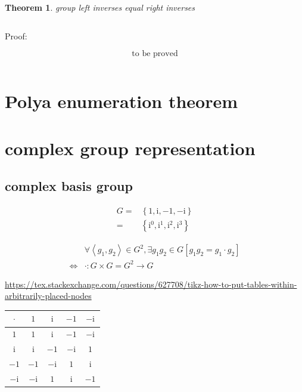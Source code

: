 \documentclass[
]{book}
\newtheorem{theorem}{Theorem}[chapter]
\theoremstyle{definition}
\theoremstyle{definition}
\theoremstyle{definition}
\theoremstyle{definition}
\theoremstyle{remark}
\begin{document}
\begin{theorem}
\protect\hypertarget{thm:unnamed-chunk-2}{}\label{thm:unnamed-chunk-2}group left inverses equal right inverses
\end{theorem}

\[
\
\]

Proof:

\[
\text{to be proved}
\]

\[
\tag*{$\Box$}
\]

\section{Polya enumeration theorem}\label{polya-enumeration-theorem}

\section{complex group representation}\label{complex-group-representation}

\subsection{complex basis group}\label{complex-basis-group}

\[
\begin{aligned}
G= & \left\{ 1,\mathrm{i},-1,-\mathrm{i}\right\} \\
= & \left\{ \mathrm{i}^{0},\mathrm{i}^{1},\mathrm{i}^{2},\mathrm{i}^{3}\right\} 
\end{aligned}
\]

\[
\begin{aligned}
 & \forall\left\langle g_{{\scriptscriptstyle 1}},g_{{\scriptscriptstyle 2}}\right\rangle \in G^{2},\exists g_{{\scriptscriptstyle 1}}g_{{\scriptscriptstyle 2}}\in G\left[g_{{\scriptscriptstyle 1}}g_{{\scriptscriptstyle 2}}=g_{{\scriptscriptstyle 1}}\cdot g_{{\scriptscriptstyle 2}}\right]\\
\Leftrightarrow & \cdot:G\times G=G^{2}\rightarrow G
\end{aligned}
\]

\url{https://tex.stackexchange.com/questions/627708/tikz-how-to-put-tables-within-arbitrarily-placed-nodes}

\begin{tabular}{|c|c|c|c|c|}
\hline 
$\cdot$ & $1$ & $\mathrm{i}$ & $-1$ & $-\mathrm{i}$\tabularnewline
\hline 
$1$ & $1$ & $\mathrm{i}$ & $-1$ & $-\mathrm{i}$\tabularnewline
\hline 
$\mathrm{i}$ & $\mathrm{i}$ & $-1$ & $-\mathrm{i}$ & $1$\tabularnewline
\hline 
$-1$ & $-1$ & $-\mathrm{i}$ & $1$ & $\mathrm{i}$\tabularnewline
\hline 
$-\mathrm{i}$ & $-\mathrm{i}$ & $1$ & $\mathrm{i}$ & $-1$\tabularnewline
\hline 
\end{tabular}
\end{document}
